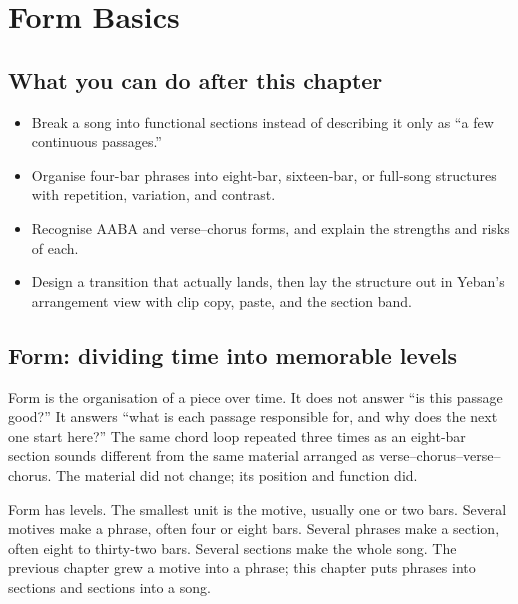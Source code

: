 \clearpage
\chapter{Form Basics}


\label{sec:form-basics}

\section*{What you can do after this chapter}
\begin{itemize}
  \item Break a song into functional sections instead of describing it only as ``a few continuous passages.''
  \item Organise four-bar phrases into eight-bar, sixteen-bar, or full-song structures with repetition, variation, and contrast.
  \item Recognise AABA and verse--chorus forms, and explain the strengths and risks of each.
  \item Design a transition that actually lands, then lay the structure out in Yeban's arrangement view with clip copy, paste, and the section band.
\end{itemize}

\section{Form: dividing time into memorable levels}

Form is the organisation of a piece over time. It does not answer ``is this passage good?'' It answers ``what is each passage responsible for, and why does the next one start here?'' The same chord loop repeated three times as an eight-bar section sounds different from the same material arranged as verse--chorus--verse--chorus. The material did not change; its position and function did.

Form has levels. The smallest unit is the motive, usually one or two bars. Several motives make a phrase, often four or eight bars. Several phrases make a section, often eight to thirty-two bars. Several sections make the whole song. The previous chapter grew a motive into a phrase; this chapter puts phrases into sections and sections into a song.

